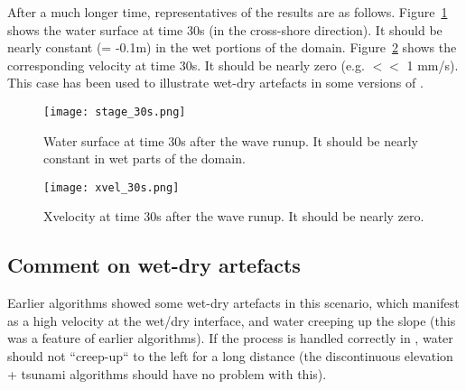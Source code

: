 After a much longer time, representatives of the results are as follows. Figure~\ref{fig:stage_30s} shows the water surface at time 30s (in the cross-shore direction). It should be nearly constant (= -0.1m) in the wet portions of the domain. Figure~\ref{fig:xvel_30s} shows the corresponding velocity at time 30s. It should be nearly zero (e.g. $<<$ 1 mm/s). This case has been used to illustrate wet-dry artefacts in some versions of \anuga.
\begin{figure}
\begin{center}
\texttt{[image: stage\_30s.png]}
\caption{Water surface at time 30s after the wave runup. It should be nearly constant in wet parts of the domain.}
\label{fig:stage_30s}
\end{center}
\end{figure}

\begin{figure}
\begin{center}
\texttt{[image: xvel\_30s.png]}
\caption{Xvelocity at time 30s after the wave runup. It should be nearly zero.}
\label{fig:xvel_30s}
\end{center}
\end{figure}

\subsection{Comment on wet-dry artefacts}
Earlier \anuga{} algorithms showed some wet-dry artefacts in this scenario, which manifest as a high velocity at the wet/dry interface, and water creeping up the slope (this was a feature of earlier \anuga{} algorithms). If the process is handled correctly in \anuga{}, water should not ``creep-up`` to the left for a long distance (the discontinuous elevation + tsunami algorithms should have no problem with this).


\endinput
